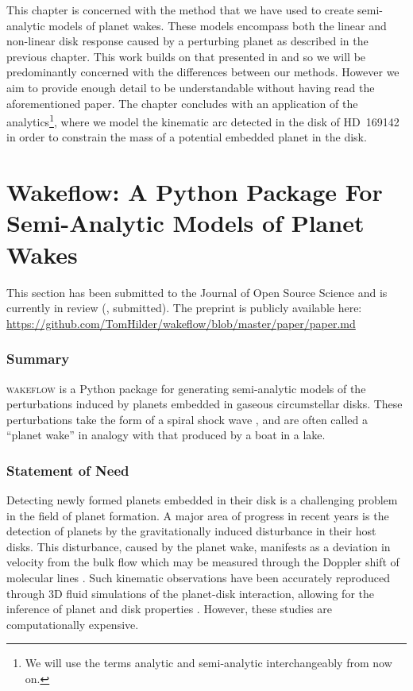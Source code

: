 \setlength{\headheight}{13.59999pt}

This chapter is concerned with the method that we have used to create semi-analytic models of planet wakes.
These models encompass both the linear and non-linear disk response caused by a perturbing planet as described in the previous chapter. 
This work builds on that presented in \citet{bollati2021} and so we will be predominantly concerned with the differences between our methods.
However we aim to provide enough detail to be understandable without having read the aforementioned paper.
The chapter concludes with an application of the analytics\footnote{We will use the terms analytic and semi-analytic interchangeably from now on.}, where we model the kinematic arc detected in the disk of HD~169142 in order to constrain the mass of a potential embedded planet in the disk.

\section{Wakeflow: A Python Package For Semi-Analytic Models of Planet Wakes} \label{sec:JOSS}

This section has been submitted to the Journal of Open Source Science and is currently in review (\citeauthor{hildersubmitted}, submitted). The preprint is publicly available here: \url{https://github.com/TomHilder/wakeflow/blob/master/paper/paper.md}

\subsubsection{Summary}

\textsc{wakeflow} is a Python package for generating semi-analytic models of the perturbations induced by planets embedded in gaseous circumstellar disks. 
These perturbations take the form of a spiral shock wave \citep{ogilvie2002}, and are often called a ``planet wake'' in analogy with that produced by a boat in a lake.

\subsubsection{Statement of Need}

Detecting newly formed planets embedded in their disk is a challenging problem in the field of planet formation. 
A major area of progress in recent years is the detection of planets by the gravitationally induced disturbance in their host disks. 
This disturbance, caused by the planet wake, manifests as a deviation in velocity from the bulk flow which may be measured through the Doppler shift of molecular lines \citep[e.g.][]{perez2015, pinte2018a}. 
Such kinematic observations have been accurately reproduced through 3D fluid simulations of the planet-disk interaction, allowing for the inference of planet and disk properties \citep{pinte2018a, pinte2019}. 
However, these studies are computationally expensive.

